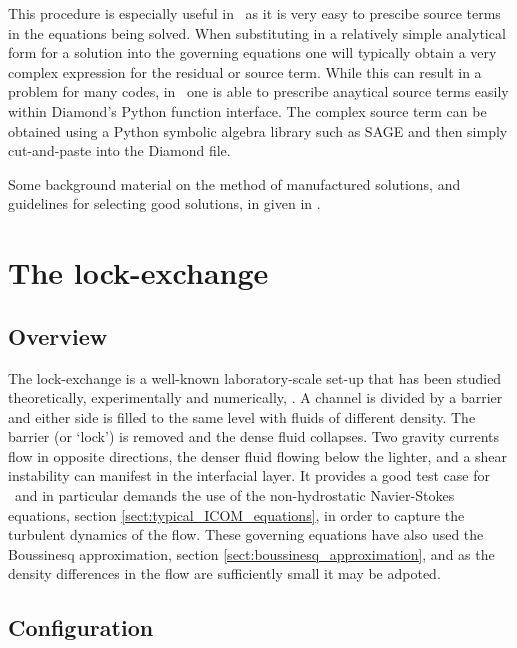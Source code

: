 This procedure is especially useful in \fluidity\ as it is very easy to prescibe source terms in the equations
being solved. When substituting in a relatively simple analytical form for a solution into the governing
equations one will typically obtain a very complex expression for the residual or source term. While this
can result in a problem for many codes, in \fluidity\ one is able to prescribe anaytical source terms easily
within Diamond's Python function interface. The complex source term can be obtained using a Python symbolic algebra
library such as SAGE and then simply cut-and-paste into the Diamond file.

Some background material on the method of manufactured solutions, and guidelines for selecting good solutions,
in given in \cite{????}. 


\section{The lock-exchange}
\label{sect:lock_exchange}
\subsection{Overview}
\label{sect:lock_exchange_overview}

The lock-exchange is a well-known laboratory-scale set-up that has been studied theoretically, experimentally and numerically, \citep{benjamin_68, klemp_94, hartel_00}. A channel is divided by a barrier and either side is filled to the same level with fluids of different density. The barrier (or ‘lock’) is removed and the dense fluid collapses. Two gravity currents flow in opposite directions, the denser fluid flowing below the lighter, and
a shear instability can manifest in the interfacial layer. It provides a good test case for \fluidity\ and in particular demands the use of the non-hydrostatic Navier-Stokes equations, section \ref{sect:typical_ICOM_equations}, in order to capture the turbulent dynamics of the flow. These governing equations have also used the Boussinesq approximation, section \ref{sect:boussinesq_approximation}, and as the density differences in the flow are sufficiently small it may be adpoted. 

\subsection{Configuration}
\label{sect:lock_exchange_configuration}

